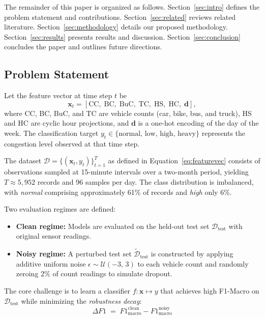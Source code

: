 \documentclass[conference,onecolumn,12pt]{IEEEtran}
\begin{document}
The remainder of this paper is organized as follows.
Section~\ref{sec:intro} defines the problem statement and contributions.
Section~\ref{sec:related} reviews related literature.
Section~\ref{sec:methodology} details our proposed methodology.
Section~\ref{sec:results} presents results and discussion.
Section~\ref{sec:conclusion} concludes the paper and outlines future
directions.

\subsection{Problem Statement}
\label{sec:problem}

Let the feature vector at time step $t$ be
\begin{equation}
  \mathbf{x}_t = [\text{CC},\;\text{BC},\;\text{BuC},\;\text{TC},\;
                  \text{HS},\;\text{HC},\;\mathbf{d}],
  \label{eq:featurevec}
\end{equation}
where CC, BC, BuC, and TC are vehicle counts (car, bike, bus, and truck),
HS and HC are cyclic hour projections, and $\mathbf{d}$ is a one-hot
encoding of the day of the week. The
classification target
$y_t \in \{\text{normal},\,\text{low},\,\text{high},\,\text{heavy}\}$
represents the congestion level observed at that time step.

The dataset $\mathcal{D} = \{(\mathbf{x}_t, y_t)\}_{t=1}^{T}$ as defined in
Equation~\eqref{eq:featurevec} consists of
observations sampled at 15-minute intervals over a two-month period, yielding
$T \approx 5{,}952$ records and 96 samples per day. The class distribution is
imbalanced, with \emph{normal} comprising approximately 61\% of records and
\emph{high} only 6\%.

Two evaluation regimes are defined:
\begin{itemize}
  \item \textbf{Clean regime:} Models are evaluated on the held-out test set
    $\mathcal{D}_{\text{test}}$ with original sensor readings.
  \item \textbf{Noisy regime:} A perturbed test set
    $\tilde{\mathcal{D}}_{\text{test}}$ is constructed by applying additive
    uniform noise $\epsilon \sim \mathcal{U}(-3,\,3)$ to each vehicle count
    and randomly zeroing 2\% of count readings to simulate dropout.
\end{itemize}

The core challenge is to learn a classifier $f\colon \mathbf{x} \mapsto y$
that achieves high F1-Macro on $\mathcal{D}_{\text{test}}$ while minimizing
the \emph{robustness decay}:
\begin{equation}
  \Delta F1 \;=\; F1^{\text{clean}}_{\text{macro}} - F1^{\text{noisy}}_{\text{macro}}
  \label{eq:decay}
\end{equation}
\end{document}
